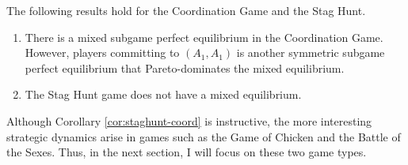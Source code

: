 \documentclass[main.tex]{subfiles}
\begin{document}
\begin{corollary}
    The following results hold for the Coordination Game and the Stag Hunt.

    \begin{enumerate}
        \item There is a mixed subgame perfect equilibrium in the Coordination Game. However, players committing to $(A_1,A_1)$ is another symmetric subgame perfect equilibrium that Pareto-dominates the mixed equilibrium.
        \item The Stag Hunt game does not have a mixed equilibrium.
    \end{enumerate}
    \label{cor:staghunt-coord}
\end{corollary}

\noindent Although Corollary \ref{cor:staghunt-coord} is instructive, the more interesting strategic dynamics arise in games such as the Game of Chicken and the Battle of the Sexes. Thus, in the next section, I will focus on these two game types.
\end{document}
